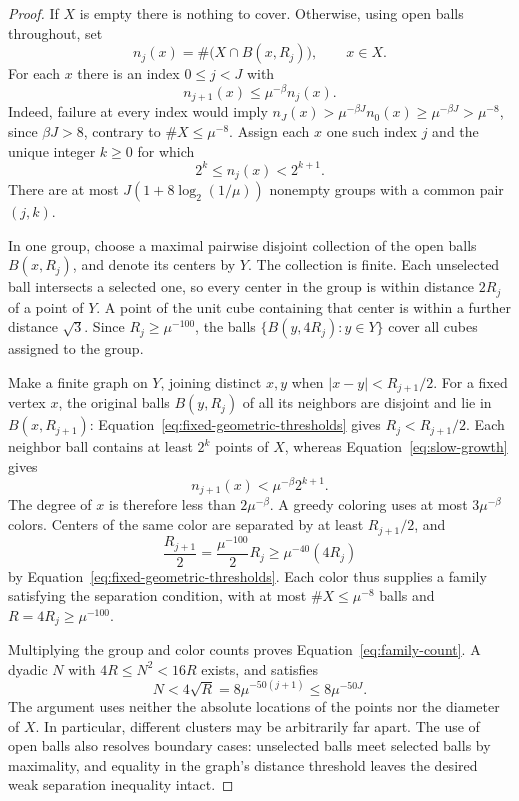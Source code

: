 \begin{proof}
If $X$ is empty there is nothing to cover.  Otherwise, using open
balls throughout, set
\[
 n_j(x)=\#\bigl(X\cap B(x,R_j)\bigr),\qquad x\in X.
\]
For each $x$ there is an index $0\leq j<J$ with
\begin{equation}\label{eq:slow-growth}
 n_{j+1}(x)\leq\mu^{-\beta}n_j(x).
\end{equation}
Indeed, failure at every index would imply
$n_J(x)>\mu^{-\beta J}n_0(x)\geq\mu^{-\beta J}>\mu^{-8}$,
since $\beta J>8$, contrary to $\#X\leq\mu^{-8}$.
Assign each $x$ one such index $j$ and the unique integer $k\geq0$
for which
\[
 2^k\leq n_j(x)<2^{k+1}.
\]
There are at most $J(1+8\log_2(1/\mu))$ nonempty groups
with a common pair $(j,k)$.

In one group, choose a maximal pairwise disjoint collection of
the open balls $B(x,R_j)$, and denote its centers by $Y$.
The collection is finite.  Each unselected ball intersects a
selected one, so every center in the group is within distance
$2R_j$ of a point of $Y$.  A point of the unit cube containing
that center is within a further distance $\sqrt3$.
Since $R_j\geq\mu^{-100}$, the balls
$\{B(y,4R_j):y\in Y\}$ cover all cubes assigned to the group.

Make a finite graph on $Y$, joining distinct $x,y$ when
$|x-y|<R_{j+1}/2$.  For a fixed vertex $x$, the original balls
$B(y,R_j)$ of all its neighbors are disjoint and lie in
$B(x,R_{j+1})$: Equation~\eqref{eq:fixed-geometric-thresholds}
gives $R_j<R_{j+1}/2$.  Each neighbor ball contains at least
$2^k$ points of $X$, whereas
Equation~\eqref{eq:slow-growth} gives
\[
 n_{j+1}(x)<\mu^{-\beta}2^{k+1}.
\]
The degree of $x$ is therefore less than $2\mu^{-\beta}$.
A greedy coloring uses at most $3\mu^{-\beta}$ colors.
Centers of the same color are separated by at least
$R_{j+1}/2$, and
\[
 \frac{R_{j+1}}2
 =\frac{\mu^{-100}}2R_j
 \geq\mu^{-40}(4R_j)
\]
by Equation~\eqref{eq:fixed-geometric-thresholds}.
Each color thus supplies a family satisfying the separation
condition, with at most $\#X\leq\mu^{-8}$ balls and
$R=4R_j\geq\mu^{-100}$.

Multiplying the group and color counts proves
Equation~\eqref{eq:family-count}.  A dyadic $N$ with
$4R\leq N^2<16R$ exists, and satisfies
\[
 N<4\sqrt R=8\mu^{-50(j+1)}\leq8\mu^{-50J}.
\]
The argument uses neither the absolute locations of the points
nor the diameter of $X$.  In particular, different clusters may
be arbitrarily far apart.  The use of open balls also resolves
boundary cases: unselected balls meet selected balls by maximality,
and equality in the graph's distance threshold leaves the desired
weak separation inequality intact.
\end{proof}

